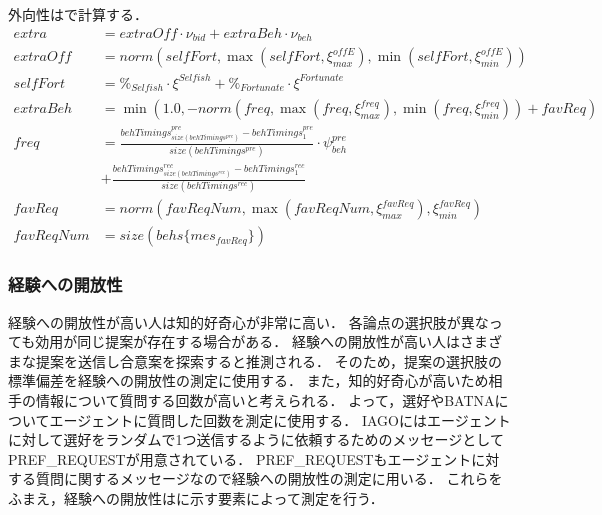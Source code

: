 外向性はで計算する．
\begin{align}
    extra &= \mathit{extraOff} \cdot \nu_{\mathit{bid}} + extraBeh \cdot \nu_{beh} \label{eq:extraversion} \\
    \mathit{extraOff} &= norm\left( \mathit{selfFort}, \max \left( \mathit{selfFort}, \xi_{max}^{\mathit{offE}}\right) , \min \left( \mathit{selfFort}, \xi_{min}^{\mathit{offE}}\right) \right) \nonumber \\
    \mathit{selfFort} &= \%_{\mathit{Selfish}} \cdot \xi^{\mathit{Selfish}} + \%_{Fortunate} \cdot \xi^{\mathit{Fortunate}} \nonumber \\
    extraBeh &= \min \left( 1.0, -norm\left( \mathit{freq}, \max \left( \mathit{freq}, \xi_{max}^{\mathit{freq}}\right), \min\left( \mathit{freq}, \xi_{min}^{\mathit{freq}}\right) \right) + \mathit{favReq}\right) \nonumber \\
    \mathit{freq} &= \frac{behTimings^{pre}_{size(behTimings^{pre})} - behTimings^{pre}_1}{size(behTimings^{pre})} \cdot \psi_{\mathit{beh}}^{pre} \nonumber \\
    &+ \frac{behTimings^{rec}_{size(behTimings^{rec})} - behTimings^{rec}_1}{size(behTimings^{rec})} \nonumber \\
    \mathit{favReq} &= norm\left( \mathit{favReqNum}, \max \left( \mathit{favReqNum}, \xi_{max}^{\mathit{favReq}}\right), \xi_{min}^{\mathit{favReq}} \right) \nonumber \\
    \mathit{favReqNum} &= size(behs\{mes_{\mathit{favReq}}\}) \nonumber
\end{align}

\subsubsection*{経験への開放性}
経験への開放性が高い人は知的好奇心が非常に高い．
各論点の選択肢が異なっても効用が同じ提案が存在する場合がある．
経験への開放性が高い人はさまざまな提案を送信し合意案を探索すると推測される．
そのため，提案の選択肢の標準偏差を経験への開放性の測定に使用する．
また，知的好奇心が高いため相手の情報について質問する回数が高いと考えられる．
よって，選好やBATNAについてエージェントに質問した回数を測定に使用する．
IAGOにはエージェントに対して選好をランダムで1つ送信するように依頼するためのメッセージとしてPREF\_REQUESTが用意されている．
PREF\_REQUESTもエージェントに対する質問に関するメッセージなので経験への開放性の測定に用いる．
これらをふまえ，経験への開放性はに示す要素によって測定を行う．

